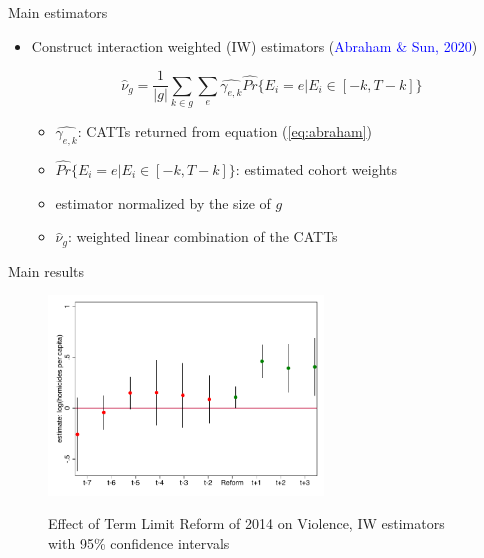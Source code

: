 \documentclass{beamer}
\begin{document}
\begin{frame}[label=iw_estimators]{Main estimators}
\begin{itemize}
 		  \setlength\itemsep{0.5em}   

	\item Construct interaction weighted (IW) estimators (\textcolor{blue}{Abraham \& Sun, 2020})

 \begin{equation}
\hat{\nu}_g=\frac{1}{|g|}\sum_{k \in g}\sum_e \hat{\gamma_{e,k}} \hat{Pr}\{E_i=e | E_i \in [-k, T-k]\}	 
\end{equation} 
 
\begin{itemize}
\item $\hat{\gamma_{e,k}}$: CATTs returned from equation (\textcolor{blue}{\ref{eq:abraham}})  %
\item $\hat{Pr}\{E_i=e | E_i \in [-k, T-k]\}$: estimated cohort weights
\item estimator normalized by the size of  $g$
\item $\hat{\nu}_g$: weighted linear combination of the CATTs
\end{itemize}

\end{itemize}

\end{frame}
\begin{frame}[label=main_results]{Main results}
\begin{figure}[h] 
\centering
\caption{Effect of Term Limit Reform of 2014 on Violence, IW estimators with 95\% confidence intervals}
\label{fig:event_study_log}
 
\includegraphics[width=0.65\textwidth]{Figures_pres/event_study_log.pdf}
       \captionsetup{justification=centering}

 \hyperlink{ihs_results}{} 

\end{figure}   

\end{frame}
\end{document}
